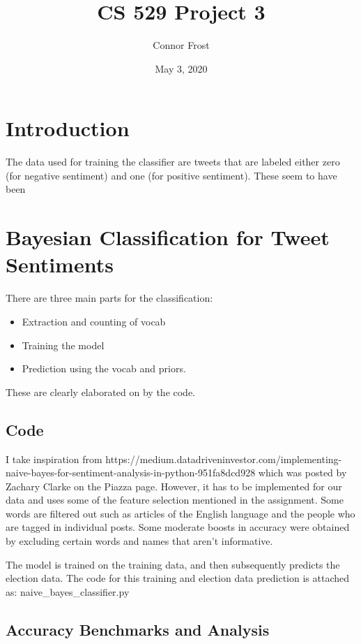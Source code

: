 \documentclass{article}
\title{CS 529 Project 3}
\author{Connor Frost}
\date{May 3, 2020}
\begin{document}
\maketitle

\section*{Introduction}

The data used for training the classifier are tweets that are labeled either zero (for negative sentiment) and one (for positive sentiment). These seem to have been 

\section{Bayesian Classification for Tweet Sentiments}

There are three main parts for the classification:

\begin{itemize}
    \item Extraction and counting of vocab
    \item Training the model
    \item Prediction using the vocab and priors.
\end{itemize}

\noindent These are clearly elaborated on by the code.

\subsection{Code}

I take inspiration from https://medium.datadriveninvestor.com/implementing-naive-bayes-for-sentiment-analysis-in-python-951fa8dcd928 which was posted by Zachary Clarke on the Piazza page. However, it has to be implemented for our data and uses some of the feature selection mentioned in the assignment. Some words are filtered out such as articles of the English language and the people who are tagged in individual posts. Some moderate boosts in accuracy were obtained by excluding certain words and names that aren't informative.

\noindent The model is trained on the training data, and then subsequently predicts the election data. The code for this training and election data prediction is attached as: naive\_bayes\_classifier.py

\subsection{Accuracy Benchmarks and Analysis}
\end{document}
